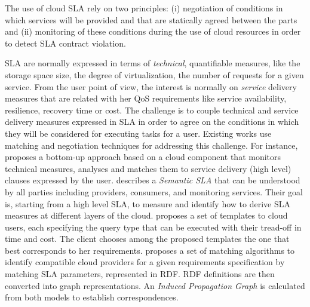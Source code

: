 The use of cloud SLA rely on two principles: (i)  negotiation of conditions in which services will be provided and that are statically agreed between the parts and (ii)  monitoring of these conditions during the use of cloud resources in order to detect SLA contract violation.




SLA are normally expressed in terms of \textit{technical}, quantifiable measures, like the storage space size, the degree of virtualization, the number of requests for a given service. 
From the user point of view, the interest is normally on \textit{service} delivery measures that are related with her QoS requirements like service availability, resilience, recovery time or cost.
The challenge is to couple technical and service delivery measures expressed in SLA in order to agree on the conditions in which they will be considered for executing tasks for a user. Existing works use matching and negotiation techniques for addressing this challenge.  
For instance,~\cite{5547150} 
proposes a bottom-up approach based on a cloud component that monitors technical measures, analyses and matches them to service delivery (high level) clauses expressed by the user.
\cite{Dastjerdi:2012:DOA:2275356.2275360} describes a \textit{Semantic SLA} that can be understood by all parties including providers, consumers, and monitoring services.
Their goal is, starting from a high level SLA, to measure and identify how to derive SLA measures  at different layers of the cloud.  
\cite{Ortiz:2013:VPS:2486767.2486772} proposes a set of templates to cloud users, each specifying the query type that can be executed with their tread-off in time and cost.  
The client  chooses among the proposed templates the one that best corresponds   to her requirements. \cite{6141307} proposes a set of matching algorithms to identify compatible cloud providers for a given requirements specification by matching SLA parameters, represented in RDF. RDF definitions are then converted into graph representations. An \textit{Induced Propagation Graph} is calculated from both models to establish correspondences.


